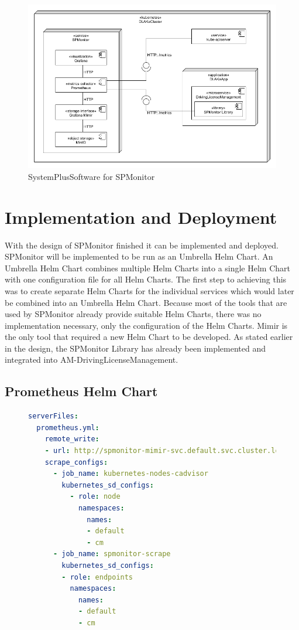 \begin{figure}[tb]
  \centering
  \includegraphics[width=\textwidth]{figures/sps_spmonitor.png}
  \caption{SystemPlusSoftware for SPMonitor}
  \label{fig:sps_spmonitor}
\end{figure}

\section{Implementation and Deployment}
\label{sec:impl_and_deployment}

With the design of SPMonitor finished it can be implemented and deployed.
SPMonitor will be implemented to be run as an Umbrella Helm Chart.
An Umbrella Helm Chart combines multiple Helm Charts into a single Helm Chart with one configuration file
for all Helm Charts.
The first step to achieving this was to create separate Helm Charts for the individual services
which would later be combined into an Umbrella Helm Chart.
Because most of the tools that are used by SPMonitor already provide suitable Helm Charts,
there was no implementation necessary, only the configuration of the Helm Charts. Mimir is the only tool
that required a new Helm Chart to be developed.
As stated earlier in the design, the SPMonitor Library has already been implemented and integrated into AM-DrivingLicenseManagement.

\subsection*{Prometheus Helm Chart}

\begin{figure}[tb]
\begin{lstlisting}[caption = {Prometheus Helm Chart Configuration}, label = {lis:prometheus_config}, style = kit-cm, language=yaml]
serverFiles:
  prometheus.yml:
    remote_write:
    - url: http://spmonitor-mimir-svc.default.svc.cluster.local:9009/api/v1/push
    scrape_configs:
      - job_name: kubernetes-nodes-cadvisor
        kubernetes_sd_configs:
          - role: node
            namespaces:
              names:
              - default
              - cm
      - job_name: spmonitor-scrape
        kubernetes_sd_configs:
        - role: endpoints
          namespaces:
            names:
            - default
            - cm
\end{lstlisting}
\end{figure}

